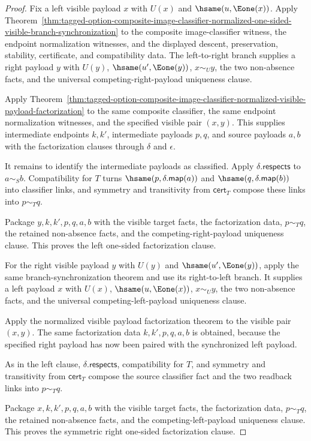 \begin{proof}
Fix a left visible payload $x$ with $U(x)$ and $\hsame(u,\Eone(x))$. Apply
Theorem~\ref{thm:tagged-option-composite-image-classifier-normalized-one-sided-visible-branch-synchronization}
to the composite image-classifier witness, the endpoint normalization witnesses,
and the displayed descent, preservation, stability, certificate, and
compatibility data. The left-to-right branch supplies a right payload $y$ with
$U(y)$, $\hsame(u',\Eone(y))$, $x\sim_U y$, the two non-absence facts, and the
universal competing-right-payload uniqueness clause.

Apply
Theorem~\ref{thm:tagged-option-composite-image-classifier-normalized-visible-payload-factorization}
to the same composite classifier, the same endpoint normalization witnesses, and
the specified visible pair $(x,y)$. This supplies intermediate endpoints
$k,k'$, intermediate payloads $p,q$, and source payloads $a,b$ with the
factorization clauses through $\delta$ and $\epsilon$.

It remains to identify the intermediate payloads as classified. Apply
$\delta.\mathsf{respects}$ to $a\sim_S b$. Compatibility for $T$ turns
$\hsame(p,\delta.\mathsf{map}(a))$ and
$\hsame(q,\delta.\mathsf{map}(b))$ into classifier links, and symmetry and
transitivity from $\mathsf{cert}_T$ compose these links into $p\sim_T q$.

Package $y,k,k',p,q,a,b$ with the visible target facts, the factorization data,
$p\sim_T q$, the retained non-absence facts, and the competing-right-payload
uniqueness clause. This proves the left one-sided factorization clause.

For the right visible payload $y$ with $U(y)$ and $\hsame(u',\Eone(y))$, apply
the same branch-synchronization theorem and use its right-to-left branch. It
supplies a left payload $x$ with $U(x)$, $\hsame(u,\Eone(x))$, $x\sim_U y$, the
two non-absence facts, and the universal competing-left-payload uniqueness
clause.

Apply the normalized visible payload factorization theorem to the visible pair
$(x,y)$. The same factorization data $k,k',p,q,a,b$ is obtained, because the
specified right payload has now been paired with the synchronized left payload.

As in the left clause, $\delta.\mathsf{respects}$, compatibility for $T$, and
symmetry and transitivity from $\mathsf{cert}_T$ compose the source classifier
fact and the two readback links into $p\sim_T q$.

Package $x,k,k',p,q,a,b$ with the visible target facts, the factorization data,
$p\sim_T q$, the retained non-absence facts, and the competing-left-payload
uniqueness clause. This proves the symmetric right one-sided factorization
clause.
\end{proof}

